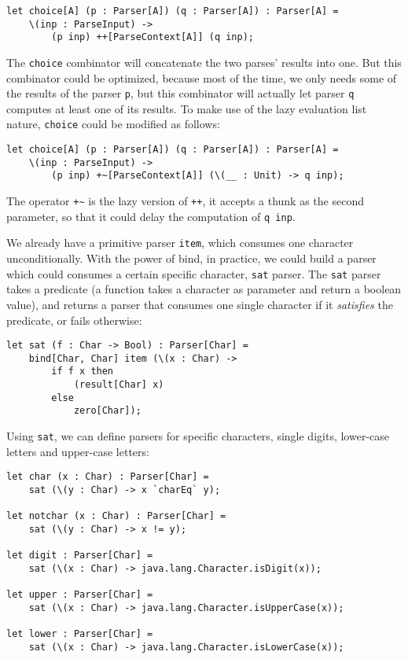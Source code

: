 \begin{lstlisting}
let choice[A] (p : Parser[A]) (q : Parser[A]) : Parser[A] =
    \(inp : ParseInput) ->
        (p inp) ++[ParseContext[A]] (q inp);
\end{lstlisting}

The \texttt{choice} combinator will concatenate the two parses' results into one. But this combinator could be optimized, because most of the time, we only needs some of the results of the parser \texttt{p}, but this combinator will actually let parser \texttt{q} computes at least one of its results. To make use of the lazy evaluation list nature, \texttt{choice} could be modified as follows:

\begin{lstlisting}
let choice[A] (p : Parser[A]) (q : Parser[A]) : Parser[A] =
    \(inp : ParseInput) ->
        (p inp) +~[ParseContext[A]] (\(__ : Unit) -> q inp);
\end{lstlisting}

The operator \texttt{+\textasciitilde{}} is the lazy version of \texttt{++}, it accepts a thunk as the second parameter, so that it could delay the computation of \texttt{q inp}.

We already have a primitive parser \texttt{item}, which consumes one character unconditionally. With the power of bind, in practice, we could build a parser which could consumes a certain specific character, \texttt{sat} parser. The \texttt{sat} parser takes a predicate (a function takes a character as parameter and return a boolean value), and returns a parser that consumes one single character if it \textit{satisfies} the predicate, or fails otherwise:

\begin{lstlisting}
let sat (f : Char -> Bool) : Parser[Char] =
    bind[Char, Char] item (\(x : Char) ->
        if f x then
            (result[Char] x)
        else
            zero[Char]);
\end{lstlisting}

Using \texttt{sat}, we can define parsers for specific characters, single digits, lower-case letters and upper-case letters:

\begin{lstlisting}
let char (x : Char) : Parser[Char] =
    sat (\(y : Char) -> x `charEq` y);

let notchar (x : Char) : Parser[Char] =
    sat (\(y : Char) -> x != y);

let digit : Parser[Char] =
    sat (\(x : Char) -> java.lang.Character.isDigit(x));

let upper : Parser[Char] =
    sat (\(x : Char) -> java.lang.Character.isUpperCase(x));

let lower : Parser[Char] =
    sat (\(x : Char) -> java.lang.Character.isLowerCase(x));
\end{lstlisting}

